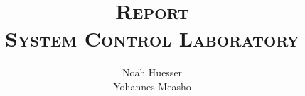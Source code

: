 \author{
  Noah Huesser\\
  Yohannes Measho
}

\title{
    \vspace{20mm}
    \Huge{
        \textsc{
            Report\\
            System Control Laboratory
        }
    }
}
